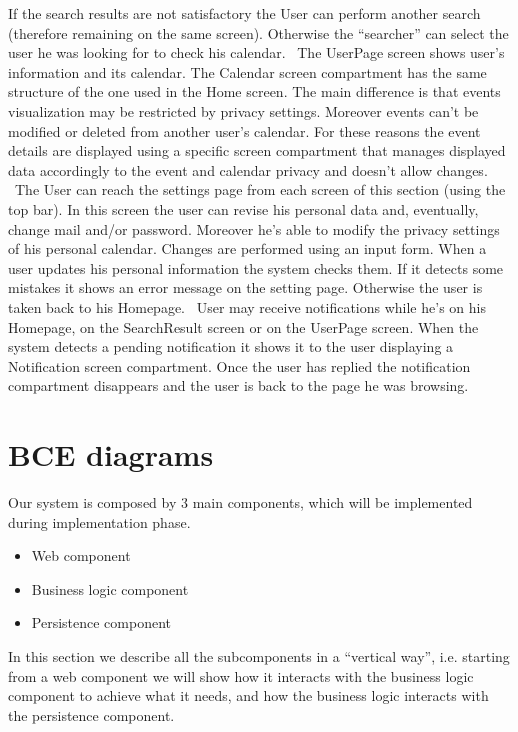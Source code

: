 \documentclass[10pt,a4paper,titlepage]{article}
\begin{document}
If the search results are not satisfactory the User can perform another search (therefore remaining on the same screen). Otherwise the “searcher” can select the user he was looking for to check his calendar.
\
The UserPage screen shows user’s information and its calendar. The Calendar screen compartment has the same structure of the one used in the Home screen. The main difference is that events visualization may be restricted by privacy settings. Moreover events can’t be modified or deleted from another user’s calendar. For these reasons the event details are displayed using a specific screen compartment that manages displayed data accordingly to the event and calendar privacy and doesn’t allow changes.
\
The User can reach the settings page from each screen of this section (using the top bar). In this screen the user can revise his personal data and, eventually, change mail and/or password. Moreover he’s able to modify the privacy settings of his personal calendar. Changes are performed using an input form. 
When a user updates his personal information the system checks them. If it detects some mistakes  it shows an error message on the setting page. Otherwise the user is taken back to his Homepage.
\
User may receive notifications while he’s on his Homepage, on the SearchResult screen or on the UserPage screen. When the system detects a pending notification it shows it to the user displaying a Notification screen compartment. Once the user has replied the notification compartment disappears and the user is back to the page he was browsing.

\section{BCE diagrams}
Our system is composed by 3 main components, which will be implemented during implementation phase.
\begin{itemize}
\item Web component
\item Business logic component
\item Persistence component
\end{itemize}
In this section we describe all the subcomponents in a ``vertical way'', i.e. starting from a web component we will show how it interacts with the business logic component to achieve what it needs, and how the business logic interacts with the persistence component.
\end{document}
